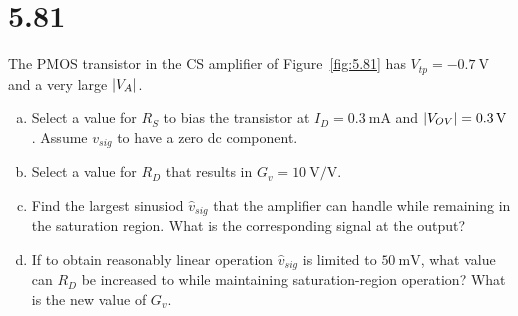 \documentclass[12pt, a4paper]{article}
\begin{document}
\section{5.81}
The PMOS transistor in the CS amplifier of Figure~\ref{fig:5.81} has $V_{tp} = \SI{-0.7}{\V}$ and a very large $\lvert V_A\rvert$.
\begin{enumerate}[(a)]
  \item Select a value for $R_S$ to bias the transistor at $I_D = \SI{0.3}{\mA}$ and $\lvert V_{OV}\rvert = \SI{0.3}{V}$. Assume $v_{sig}$ to have a zero dc component.
  \item Select a value for $R_D$ that results in $G_v = \SI{10}{\V\per\V}$.
  \item Find the largest sinusiod $\hat{v}_{sig}$ that the amplifier can handle while remaining in the saturation region. What is the corresponding signal at the output?
  \item If to obtain reasonably linear operation $\hat{v}_{sig}$ is limited to $\SI{50}{\mV}$, what value can $R_D$ be increased to while maintaining saturation-region operation? What is the new value of $G_v$.
\end{enumerate}
\end{document}
